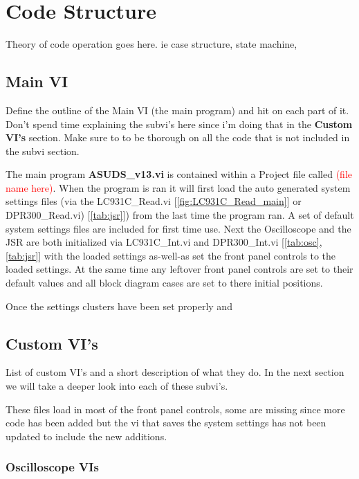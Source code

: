 \documentclass[11pt,a4paper,oldfontcommands]{memoir}
\begin{document}
\chapter{Code Structure}

Theory of code operation goes here. ie case structure, state machine, 

\section{Main VI}

Define the outline of the Main VI (the main program) and hit on each part of it.  Don't spend time explaining the subvi's here since i'm doing that in the \textbf{Custom VI's} section. Make sure to to be thorough on all the code that is not included in the subvi section.

The main program \textbf{ASUDS\_v13.vi} is contained within a Project file called \textcolor{red}{(file name here)}. When the program is ran it will first load the auto generated system settings files (via the LC931C\_Read.vi [\ref{fig:LC931C_Read_main}] or DPR300\_Read.vi) [\ref{tab:jsr}]) from the last time the program ran. A set of default system settings files are included for first time use. Next the Oscilloscope and the JSR are both initialized via LC931C\_Int.vi and DPR300\_Int.vi [\ref{tab:osc}, \ref{tab:jsr}] with the loaded settings as-well-as set the front panel controls to the loaded settings. At the same time any leftover front panel controls are set to their default values and all block diagram cases are set to there initial positions.

Once the settings clusters have been set properly and

\section{Custom VI's}

List of custom VI's and a short description of what they do. In the next section we will take a deeper look into each of these subvi's.

These files load in most of the front panel controls, some are missing since more code has been added but the vi that saves the system settings has not been updated to include the new additions.

\subsection{Oscilloscope VIs}
\end{document}

